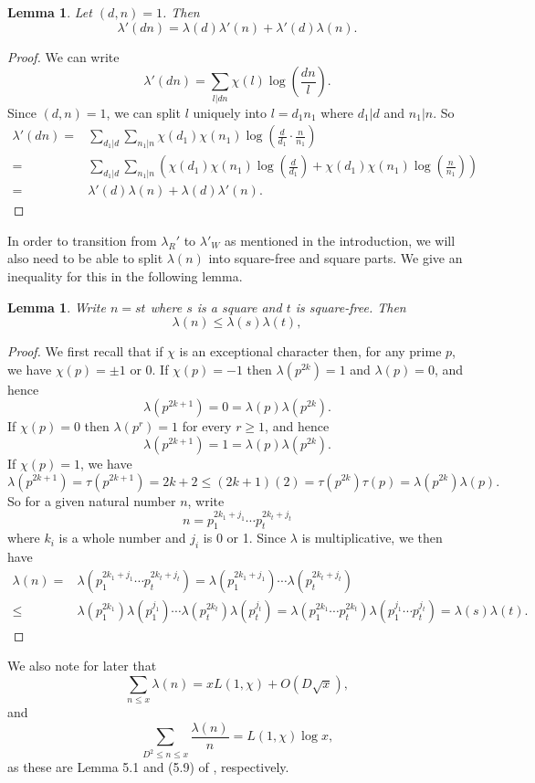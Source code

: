 \documentclass{amsart}
\newtheorem{lemma}[theorem]{Lemma}
\begin{document}
\begin{lemma}\label{split}
Let $(d,n)=1$.  Then
$$\lambda'(dn)=\lambda(d)\lambda'(n)+\lambda'(d)\lambda(n).$$
\end{lemma}

\begin{proof}
We can write
$$\lambda'(dn)=\sum_{l|dn}\chi(l)\log\left(\frac{dn}{l}\right).$$
Since $(d,n)=1$, we can split $l$ uniquely into $l=d_1n_1$ where $d_1|d$ and $n_1|n$.  So
\begin{align*}
\lambda'(dn)=&\sum_{d_1|d}\sum_{n_1|n}\chi(d_1)\chi(n_1)\log\left(\frac{d}{d_1}\cdot \frac{n}{n_1}\right)\\
= &\sum_{d_1|d}\sum_{n_1|n}\left(\chi(d_1)\chi(n_1)\log\left(\frac{d}{d_1}\right) +\chi(d_1)\chi(n_1)\log\left(\frac{n}{n_1}\right)\right)\\
= &\lambda'(d)\lambda(n) +\lambda(d)\lambda'(n).
\end{align*}
\end{proof}

In order to transition from $\lambda_R'$ to $\lambda'_W$ as mentioned in the introduction, we will also need to be able to split $\lambda(n)$ into square-free and square parts.  We give an inequality for this in the following lemma.


\begin{lemma}\label{sqsplit}
Write $n=st$ where $s$ is a square and $t$ is square-free.  Then
$$\lambda(n)\leq \lambda(s)\lambda(t),$$
\end{lemma}
\begin{proof}
We first recall that if $\chi$ is an exceptional character then, for any prime $p$, we have $\chi(p)=\pm 1$ or 0.  If $\chi(p)=-1$ then $\lambda(p^{2k})=1$ and $\lambda(p)=0$, and hence
$$\lambda(p^{2k+1})=0=\lambda(p)\lambda(p^{2k}).$$
If $\chi(p)=0$ then $\lambda(p^{r})=1$ for every $r\geq 1$, and hence
$$\lambda(p^{2k+1})=1=\lambda(p)\lambda(p^{2k}).$$
If $\chi(p)=1$, we have
$$\lambda(p^{2k+1})=\tau(p^{2k+1})=2k+2\leq (2k+1)(2)=\tau(p^{2k})\tau(p)=\lambda
(p^{2k})\lambda(p).$$
So for a given natural number $n$, write
$$n=p_1^{2k_1+j_1}\cdots p_t^{2k_t+j_t}$$
where $k_i$ is a whole number and $j_i$ is 0 or 1. Since $\lambda$ is multiplicative, we then have
\begin{align*}
\lambda(n)=&\lambda(p_1^{2k_1+j_1}\cdots p_t^{2k_t+j_t})=\lambda(p_1^{2k_1+j_1})\cdots \lambda(p_t^{2k_t+j_t})\\
\leq &\lambda(p_1^{2k_1})\lambda(p_1^{j_1})\cdots \lambda(p_t^{2k_t})\lambda(p_t^{j_t})=\lambda(p_1^{2k_1}\cdots p_t^{2k_t})\lambda(p_1^{j_1}\cdots p_t^{j_t})=\lambda(s)\lambda(t).
\end{align*}
\end{proof}
We also note for later that
$$\sum_{n\leq x}\lambda(n)=xL(1,\chi)+O\left(D\sqrt x\right),$$
and
$$\sum_{D^2\leq n\leq x}\frac{\lambda(n)}{n}=L(1,\chi)\log x,$$
as these are Lemma 5.1 and (5.9) of \cite{FI03}, respectively.
\end{document}
